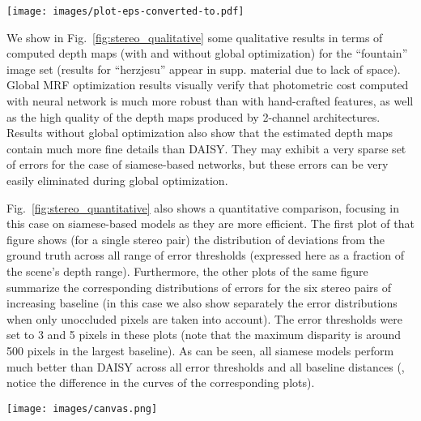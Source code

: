 \documentclass[10pt,twocolumn,letterpaper]{article}
\newcommand*{\USEIMAGES}{}
\begin{document}
\ifdefined\USEIMAGES
\begin{figure*}
\texttt{[image: images/plot-eps-converted-to.pdf]}
\caption{Quantitative comparison for wide-baseline stereo on ``fountain'' dataset. (Leftmost plot) Distribution of deviations from ground truth, %
expressed as a fraction of scene's depth range. (Other plots) Distribution of errors for stereo pairs of increasing baseline (horizontal axis) both with and without taking into account  occluded pixels (error thresholds were set equal to 1 and 3 pixels in these plots -  maximum disparity is around 500 pixels). 
}
\label{fig:stereo_quantitative}
\end{figure*}
\fi
We  show in Fig.~\ref{fig:stereo_qualitative} some qualitative results in terms of computed depth maps  (with and without global optimization) for the ``fountain'' image set (results for ``herzjesu'' appear in  supp. material due to lack of space). Global
MRF optimization results   visually verify that photometric cost computed with neural network
is much more robust than with hand-crafted features, as well as the high quality of the depth maps produced by 2-channel architectures. Results without global optimization also show that the estimated  depth maps  contain much more fine details than DAISY. They may exhibit a very sparse set of errors  for the case of siamese-based networks,  but these errors can be very easily eliminated during global optimization.

Fig.~\ref{fig:stereo_quantitative} also shows a quantitative comparison, focusing in this case on siamese-based models as they are more efficient. The first plot of that figure shows (for a single stereo pair) the distribution of deviations from the ground truth across all range of error thresholds (expressed here as a fraction of the scene's depth range).
Furthermore, the other plots of the same figure summarize the corresponding distributions of errors for the six stereo pairs of increasing baseline (in this case we  also  show separately the error distributions when  only unoccluded pixels are taken into account). The error thresholds  were set to 3 and 5 pixels  in these plots (note that the maximum disparity is around 500 pixels in the largest baseline). 
As can be seen, all siamese models 
perform much better than DAISY across all error thresholds and all baseline distances 
(\eg, notice the difference in the curves of the corresponding plots).

\ifdefined\USEIMAGES
\begin{figure*}
  \vspace{-5pt}
\begin{center}
  \texttt{[image: images/canvas.png]}
\end{center}
\vspace{-5pt}
\caption{Wide baseline stereo evaluation. From left to right:
  DAISY, \texttt{siam-2stream-}$l_2$, , \texttt{2ch}. First row - ``winner takes all'' depthmaps,
  second row - depthmaps after MRF optimization.}
  \label{fig:stereo_qualitative}
\end{figure*}
\fi
\end{document}
